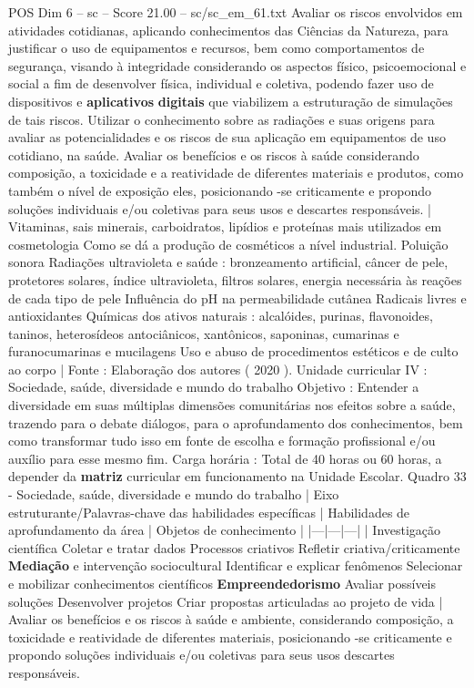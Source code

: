 \begin{textsample}{POS Dim 6 – sc – Score 21.00 – sc/sc\_em\_61.txt}
Avaliar os riscos envolvidos em atividades cotidianas, aplicando conhecimentos das Ciências da Natureza, para justificar o uso de equipamentos e recursos, bem como comportamentos de segurança, visando à integridade considerando os aspectos físico, psicoemocional e social a fim de desenvolver física, individual e coletiva, podendo fazer uso de dispositivos e \textbf{aplicativos} \textbf{digitais} que viabilizem a estruturação de simulações de tais riscos.
Utilizar o conhecimento sobre as radiações e suas origens para avaliar as potencialidades e os riscos de sua aplicação em equipamentos de uso cotidiano, na saúde.
Avaliar os benefícios e os riscos à saúde considerando composição, a toxicidade e a reatividade de diferentes materiais e produtos, como também o nível de exposição eles, posicionando -se criticamente e propondo soluções individuais e/ou coletivas para seus usos e descartes responsáveis. | Vitaminas, sais minerais, carboidratos, lipídios e proteínas mais utilizados em cosmetologia Como se dá a produção de cosméticos a nível industrial.
Poluição sonora Radiações ultravioleta e saúde : bronzeamento artificial, câncer de pele, protetores solares, índice ultravioleta, filtros solares, energia necessária às reações de cada tipo de pele Influência do pH na permeabilidade cutânea Radicais livres e antioxidantes Químicas dos ativos naturais : alcalóides, purinas, flavonoides, taninos, heterosídeos antociânicos, xantônicos, saponinas, cumarinas e furanocumarinas e mucilagens Uso e abuso de procedimentos estéticos e de culto ao corpo | Fonte : Elaboração dos autores ( 2020 ).
Unidade curricular IV : Sociedade, saúde, diversidade e mundo do trabalho Objetivo : Entender a diversidade em suas múltiplas dimensões comunitárias nos efeitos sobre a saúde, trazendo para o debate diálogos, para o aprofundamento dos conhecimentos, bem como transformar tudo isso em fonte de escolha e formação profissional e/ou auxílio para esse mesmo fim.
Carga horária : Total de 40 horas ou 60 horas, a depender da \textbf{matriz} curricular em funcionamento na Unidade Escolar.
Quadro 33 - Sociedade, saúde, diversidade e mundo do trabalho | Eixo estruturante/Palavras-chave das habilidades específicas | Habilidades de aprofundamento da área | Objetos de conhecimento | |---|---|---| | Investigação científica Coletar e tratar dados Processos criativos Refletir criativa/criticamente \textbf{Mediação} e intervenção sociocultural Identificar e explicar fenômenos Selecionar e mobilizar conhecimentos científicos \textbf{Empreendedorismo} Avaliar possíveis soluções Desenvolver projetos Criar propostas articuladas ao projeto de vida | Avaliar os benefícios e os riscos à saúde e ambiente, considerando composição, a toxicidade e reatividade de diferentes materiais, posicionando -se criticamente e propondo soluções individuais e/ou coletivas para seus usos descartes responsáveis.

\end{textsample}
